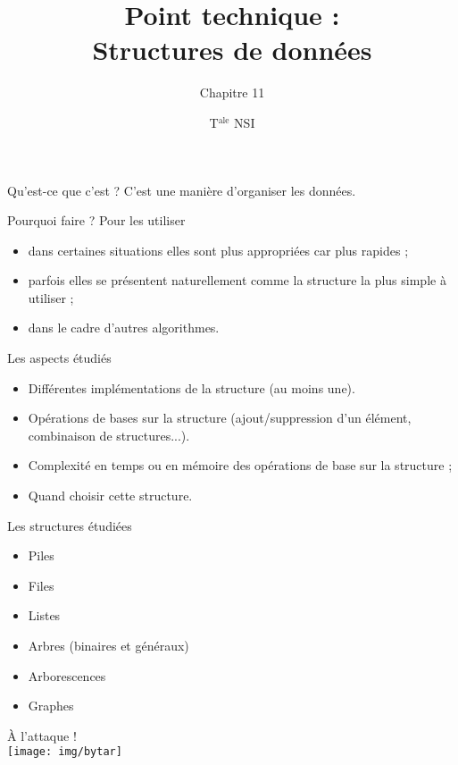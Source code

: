 \documentclass[10pt]{beamer}
\title{Point technique : \\ Structures de données}
\subtitle{Chapitre 11}
\author{T$^{\text{ale}}$ NSI}
\begin{document}
\maketitle

\begin{frame}{Qu'est-ce que c'est ?}\pause
	C'est une manière d'organiser les données.\pause
\end{frame}

\begin{frame}{Pourquoi faire ?}\pause
	Pour les utiliser \pause
	\begin{itemize}
		\item 	dans certaines situations elles sont plus appropriées car plus rapides ;\pause
		\item 	parfois elles se présentent naturellement comme la structure la plus simple à utiliser ;\pause
		\item 	dans le cadre d'autres algorithmes.
	\end{itemize}
\end{frame}

\begin{frame}{Les aspects étudiés}\pause
	\begin{itemize}
		\item 	Différentes implémentations de la structure (au moins une).\pause
		\item 	Opérations de bases sur la structure (ajout/suppression d'un élément, combinaison de structures...).\pause
		\item 	Complexité en temps ou en mémoire des opérations de base sur la structure ;\pause
		\item 	Quand choisir cette structure.
	\end{itemize}
\end{frame}

\begin{frame}{Les structures étudiées}\pause
	\begin{itemize}
	\item 	Piles\pause
	\item 	Files\pause
	\item 	Listes\pause
	\item 	Arbres (binaires et généraux)\pause
	\item 	Arborescences\pause
	\item 	Graphes	
\end{itemize}
\end{frame}
\begin{frame}
	\begin{center}
		\Huge À l'attaque !\\
		\texttt{[image: img/bytar]}	
	\end{center}
\end{frame}
\end{document}
